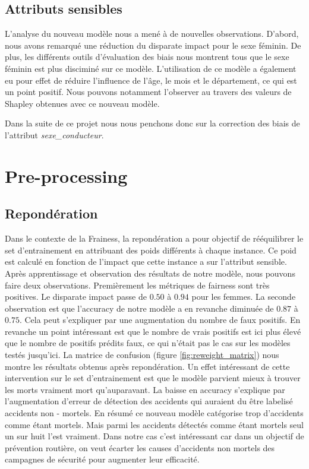\documentclass{article}
\begin{document}
    \subsection{Attributs sensibles}
    L'analyse du nouveau modèle nous a mené à de nouvelles observations. D'abord, nous avons 
    remarqué une réduction du disparate impact pour le sexe féminin. De plus, les différents 
    outils d'évaluation des biais nous montrent tous que le sexe féminin est plus disciminé sur 
    ce modèle. L'utilisation de ce modèle a également eu pour effet de réduire l'influence de 
    l'âge, le mois et le département, ce qui est un point positif. Nous pouvons notamment 
    l'observer au travers des valeurs 
    de Shapley obtenues avec ce nouveau modèle. 
    
    Dans la suite de ce projet nous nous penchons 
    donc sur la correction des biais de l'attribut \textit{sexe\_conducteur}.



    \section{Pre-processing}
    \subsection{Repondération}
    Dans le contexte de la Frainess, la repondération a pour objectif de rééquilibrer le set d'entrainement
    en attribuant des poids différents à chaque instance. Ce poid est calculé en fonction de l'impact 
    que cette instance a sur l'attribut sensible. 
    Après apprentissage et observation des résultats de notre modèle, nous pouvons faire deux 
    observations. Premièrement les métriques de fairness sont très positives. Le disparate impact 
    passe de $0.50$ à $0.94$ pour les femmes. La seconde observation est que l'accuracy de notre 
    modèle a en revanche diminuée de $0.87$ à $0.75$. Cela peut s'expliquer par une augmentation 
    du nombre de faux positifs. En revanche un point intéressant est que le nombre de 
    vrais positifs est ici plus élevé que le nombre de positifs prédits faux, ce qui n'était pas 
    le cas sur les modèles testés jusqu'ici.
    La matrice de confusion (figure \ref{fig:reweight_matrix}) nous montre 
    les résultats obtenus après repondération. Un effet intéressant de cette intervention sur le set d'entrainement
    est que le modèle parvient mieux à trouver les morts vraiment mort qu'auparavant. La baisse en accuracy s'explique
    par l'augmentation d'erreur de détection des accidents qui auraient du être labelisé accidents non - mortels. En
    résumé ce nouveau modèle catégorise trop d'accidents comme étant mortels. Mais parmi les accidents détectés comme
    étant mortels seul un sur huit l'est vraiment. Dans notre cas c'est intéressant car dans un objectif de prévention
    routière, on veut écarter les causes d'accidents non mortels des campagnes de sécurité pour augmenter leur efficacité.
\end{document}
